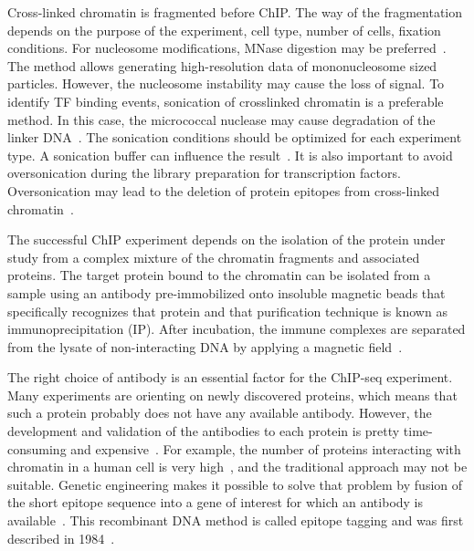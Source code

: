 Cross-linked chromatin is fragmented before ChIP. 
The way of the fragmentation depends on the purpose of the experiment, cell type, number of cells, fixation conditions. 
For nucleosome modifications, MNase digestion may be preferred~\cite{kidder2011chip}.  
The method allows generating high-resolution data of mononucleosome sized particles. 
However, the nucleosome instability may cause the loss of signal.
To identify TF binding events, sonication of crosslinked chromatin is a preferable method. 
In this case, the micrococcal nuclease may cause degradation of the linker DNA~\cite{kidder2011chip}.
The sonication conditions should be optimized for each experiment type. 
A sonication buffer can influence the result~\cite{steger2008dot1l}. 
It is also important to avoid oversonication during the library preparation for transcription factors. 
Oversonication may lead to the deletion of protein epitopes from cross-linked chromatin~\cite{ostrow2015chip}. 



The successful ChIP experiment depends on the isolation of the protein under study from a complex mixture of the chromatin fragments and associated proteins. 
The target protein bound to the chromatin can be isolated from a sample using an antibody pre-immobilized onto insoluble magnetic beads that specifically recognizes that protein and that purification technique is known as immunoprecipitation (IP). 
After incubation, the immune complexes are separated from the lysate of non-interacting DNA by applying a magnetic field~\cite{slovakova2005use}.

The right choice of antibody is an essential factor for the ChIP-seq experiment. 
Many experiments are orienting on newly discovered proteins, which means that such a protein probably does not have any available antibody. 
However, the development and validation of the antibodies to each protein is pretty time-consuming and expensive~\cite{jarvik1998epitope}. 
For example, the number of proteins interacting with chromatin in a human cell is very high~\cite{ramani2005consolidating}, and the traditional approach may not be suitable.
Genetic engineering makes it possible to solve that problem by fusion of the short epitope sequence into a gene of interest for which an antibody is available~\cite{jarvik1998epitope,brizzard2008epitope,goldberg2010distinct}. 
This recombinant DNA method is called epitope tagging and was first described in 1984~\cite{munro1984use}. 

